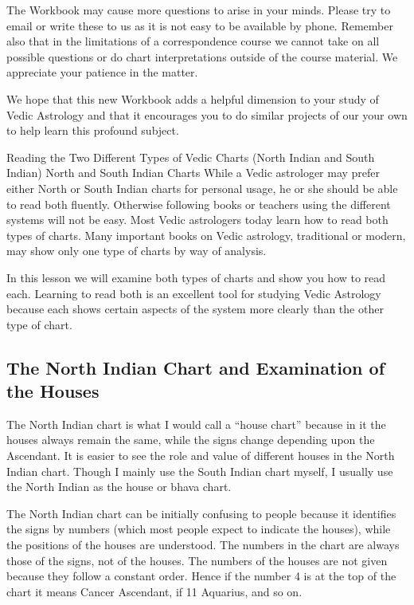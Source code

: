 The Workbook may cause more questions to arise in your minds. Please try to email or write these to us as it is not easy to be available by phone. Remember also that in the limitations of a correspondence course we cannot take on all possible questions or do chart interpretations outside of the course material. We appreciate your patience in the matter.

 

We hope that this new Workbook adds a helpful dimension to your study of Vedic Astrology and that it encourages you to do similar projects of our your own to help learn this profound subject.

 

Reading the Two Different Types of Vedic Charts (North Indian and South Indian)
North and South Indian Charts
While a Vedic astrologer may prefer either North or South Indian charts for personal usage, he or she should be able to read both fluently. Otherwise following books or teachers using the different systems will not be easy. Most Vedic astrologers today learn how to read both types of charts. Many important books on Vedic astrology, traditional or modern, may show only one type of charts by way of analysis.

 

In this lesson we will examine both types of charts and show you how to read each. Learning to read both is an excellent tool for studying Vedic Astrology because each shows certain aspects of the system more clearly than the other type of chart.

 

\subsection{The North Indian Chart and Examination of the Houses}
 

The North Indian chart is what I would call a “house chart” because in it the houses always remain the same, while the signs change depending upon the Ascendant. It is easier to see the role and value of different houses in the North Indian chart. Though I mainly use the South Indian chart myself, I usually use the North Indian as the house or bhava chart.

 

The North Indian chart can be initially confusing to people because it identifies the signs by numbers (which most people expect to indicate the houses), while the positions of the houses are understood. The numbers in the chart are always those of the signs, not of the houses. The numbers of the houses are not given because they follow a constant order. Hence if the number 4 is at the top of the chart it means Cancer Ascendant, if 11 Aquarius, and so on.

